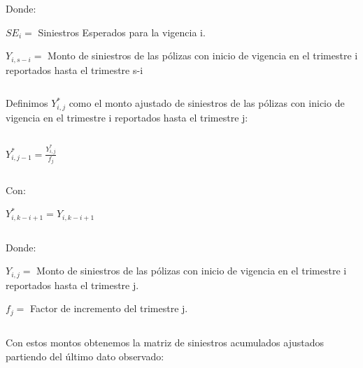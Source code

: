 \documentclass[11pt,twoside,openright,spanish]{report}
\numberwithin{equation}{chapter}
\numberwithin{figure}{chapter}
\numberwithin{table}{chapter}
\begin{document}
	
	\doublespacing

$ $

\doublespacing

	Donde:
	
	\doublespacing
	
	${SE}_{i}=$ Siniestros Esperados para la vigencia i.
	
${Y}_{i,s-i}=$ Monto de siniestros de las pólizas con inicio de vigencia en el trimestre i reportados hasta el trimestre s-i
	

	\doublespacing

$ $


	\doublespacing
	Definimos ${Y}_{i,j}^{*}$ como el monto ajustado de siniestros de las pólizas con inicio de vigencia en el trimestre i reportados hasta el trimestre j:
	
		\doublespacing
	
	$ $
	
	\doublespacing
	
	{\centering
		${Y}_{i,j-1}^{*}=\frac{{Y}_{i,j}^{*}}{{f}_{j}}$
		\noindent
		
	}	
	
	\doublespacing

$ $

\doublespacing

	Con:
		\doublespacing
		
	{\centering
	${Y}_{i,k-i+1}^{*}={Y}_{i,k-i+1}$
	
}
	
	\doublespacing

$ $

\doublespacing
	

	Donde:
	
	\doublespacing

    ${Y}_{i,j}=$ Monto de siniestros de las pólizas con inicio de vigencia en el trimestre i reportados hasta el trimestre j.
	
	${f}_{j}=$ Factor de incremento del trimestre j.
	
	
	\doublespacing

$ $

\doublespacing
\doublespacing

Con estos montos obtenemos la matriz de siniestros acumulados ajustados partiendo del último dato observado:
	

	\doublespacing

$ $

\doublespacing
	
\end{document}
